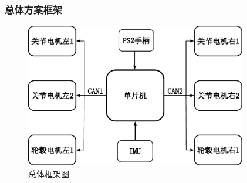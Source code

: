 \documentclass{beamer}
\begin{document}
	\begin{frame}
		\frametitle{总体方案框架}
		\begin{figure}          
			\centering              
			\includegraphics[width=3.8in]{img/chapter2/1.pdf}  
			\captionsetup{font=scriptsize} 
			\caption{总体框架图} 
		\end{figure}               
	\end{frame}
	
\end{document}

